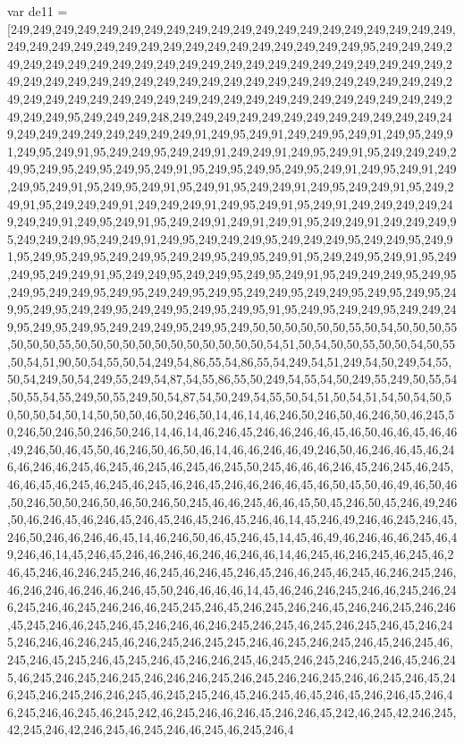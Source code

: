 var de11 = [249,249,249,249,249,249,249,249,249,249,249,249,249,249,249,249,249,249,249,249,249,249,249,249,249,249,249,249,249,249,249,249,249,249,249,249,95,249,249,249,249,249,249,249,249,249,249,249,249,249,249,249,249,249,249,249,249,249,249,249,249,249,249,249,249,249,249,249,249,249,249,249,249,249,249,249,249,249,249,249,249,249,249,249,249,249,249,249,249,249,249,249,249,249,249,249,249,249,249,249,249,249,249,95,249,249,249,248,249,249,249,249,249,249,249,249,249,249,249,249,249,249,249,249,249,249,249,249,249,91,249,95,249,91,249,249,95,249,91,249,95,249,91,249,95,249,91,95,249,249,95,249,249,91,249,249,91,249,95,249,91,95,249,249,249,249,95,249,95,249,95,249,95,249,91,95,249,95,249,95,249,95,249,91,249,95,249,91,249,249,95,249,91,95,249,95,249,91,95,249,91,95,249,249,91,249,95,249,249,91,95,249,249,91,95,249,249,249,91,249,249,249,91,249,95,249,91,95,249,91,249,249,249,249,249,249,249,91,249,95,249,91,95,249,249,91,249,91,249,91,95,249,249,91,249,249,249,95,249,249,249,95,249,249,91,249,95,249,249,249,95,249,249,249,95,249,249,95,249,91,95,249,95,249,95,249,249,95,249,249,95,249,95,249,91,95,249,249,95,249,91,95,249,249,95,249,249,91,95,249,249,95,249,249,95,249,95,249,91,95,249,249,249,95,249,95,249,95,249,249,95,249,95,249,249,95,249,95,249,249,95,249,249,95,249,95,249,95,249,95,249,95,249,249,95,249,249,95,249,95,249,95,91,95,249,95,249,249,95,249,249,249,95,249,95,249,95,249,249,249,95,249,95,249,50,50,50,50,50,50,55,50,54,50,50,50,55,50,50,50,55,50,50,50,50,50,50,50,50,50,50,50,50,54,51,50,54,50,50,55,50,50,54,50,55,50,54,51,90,50,54,55,50,54,249,54,86,55,54,86,55,54,249,54,51,249,54,50,249,54,55,50,54,249,50,54,249,55,249,54,87,54,55,86,55,50,249,54,55,54,50,249,55,249,50,55,54,50,55,54,55,249,50,55,249,50,54,87,54,50,249,54,55,50,54,51,50,54,51,54,50,54,50,50,50,50,54,50,14,50,50,50,46,50,246,50,14,46,14,46,246,50,246,50,46,246,50,46,245,50,246,50,246,50,246,50,246,14,46,14,46,246,45,246,46,246,46,45,46,50,46,46,45,46,46,49,246,50,46,45,50,46,246,50,46,50,46,14,46,46,246,46,49,246,50,46,246,46,45,46,246,46,246,46,245,46,245,46,245,46,245,46,245,50,245,46,46,46,246,45,246,245,46,245,46,46,45,46,245,46,245,46,245,46,246,45,246,46,246,46,45,46,50,45,50,46,49,46,50,46,50,246,50,50,246,50,46,50,246,50,245,46,46,245,46,46,45,50,45,246,50,45,246,49,246,50,46,246,45,46,246,45,246,45,246,45,246,45,246,46,14,45,246,49,246,46,245,246,45,246,50,246,46,246,46,45,14,46,246,50,46,45,246,45,14,45,46,49,46,246,46,46,245,46,49,246,46,14,45,246,45,246,46,246,46,246,46,246,46,14,46,245,46,246,245,46,245,46,246,45,246,46,246,245,246,46,245,46,246,45,246,45,246,46,245,46,245,46,246,245,246,46,246,246,46,246,46,246,45,50,246,46,46,46,14,45,46,246,246,245,246,46,245,246,246,245,246,46,245,246,246,46,245,245,246,45,246,245,246,246,45,246,246,245,246,246,45,245,246,46,245,246,45,246,246,46,246,245,246,245,46,245,246,245,246,45,246,245,246,246,46,246,245,46,246,245,246,245,245,246,46,245,246,245,246,45,246,245,46,245,246,45,245,246,45,245,246,45,246,246,245,46,245,246,245,246,245,246,45,246,245,46,245,246,245,246,245,246,246,246,245,246,245,246,246,245,246,46,245,246,45,246,245,246,245,246,246,245,46,245,245,246,45,246,245,46,45,246,45,246,246,45,246,46,245,246,46,245,46,245,242,46,245,246,46,246,45,246,246,45,242,46,245,42,246,245,42,245,246,42,246,245,46,245,246,46,245,46,245,246,4